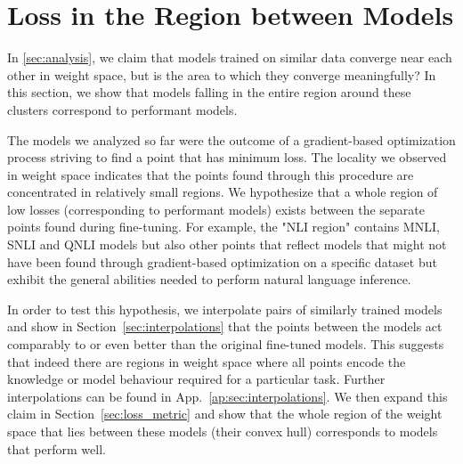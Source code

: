 \documentclass[nohyperref]{article}
\theoremstyle{plain}
\theoremstyle{definition}
\theoremstyle{remark}
\begin{document}
\section{Loss in the Region between Models}

In \ref{sec:analysis}, we claim that models trained on similar data converge near each other in weight space, but is the area to which they converge meaningfully? In this section, we show that models falling in the entire region around these clusters correspond to performant models.

The models we analyzed so far were the outcome of a gradient-based optimization process striving to find a point that has minimum loss. The locality we observed in weight space indicates that the points found through this procedure are concentrated in relatively small regions.
We hypothesize that a whole region of low losses (corresponding to performant models) exists between the separate points found during fine-tuning. For example, the "NLI region" contains MNLI, SNLI and QNLI models but also other points that reflect models that might not have been found through gradient-based optimization on a specific dataset but exhibit the general abilities needed to perform natural language inference.

In order to test this hypothesis, we interpolate pairs of similarly trained models and show in Section~\ref{sec:interpolations} that the points between the models act comparably to or even better than the original fine-tuned models. This suggests that indeed there are regions in weight space where all points encode the knowledge or model behaviour required for a particular task. Further interpolations can be found in App.~\ref{ap:sec:interpolations}.
We then expand this claim in Section~\ref{sec:loss_metric} and show that the whole region of the weight space that lies between these models (their convex hull) corresponds to models that perform well.
\end{document}

